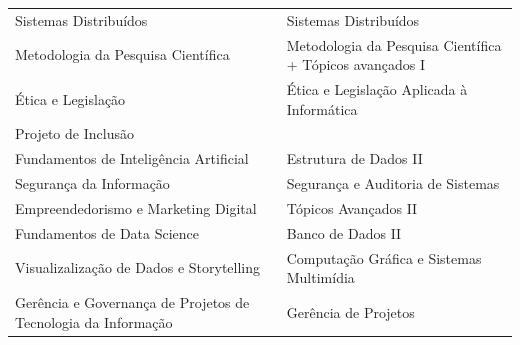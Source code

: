 \documentclass[11pt,fleqn]{book} %
\begin{document}
\begin{table}[]
{\begin{tabular}{@{}l|l@{}}
			Sistemas Distribuídos                                         & Sistemas Distribuídos                                                     \\
			Metodologia da Pesquisa Científica                            & Metodologia da Pesquisa Científica + Tópicos avançados I                  \\
			Ética e Legislação                                            & Ética e Legislação Aplicada à Informática                                 \\
			Projeto de Inclusão                                           &                                                                           \\
			Fundamentos de Inteligência Artificial                        & Estrutura de Dados II                                                     \\
			Segurança da Informação                                       & Segurança e Auditoria de Sistemas                                         \\
			Empreendedorismo e Marketing Digital                          & Tópicos Avançados II                                                      \\
			Fundamentos de Data Science                                   & Banco de Dados II                                                         \\
			Visualizalização de Dados e Storytelling                      & Computação Gráfica e Sistemas Multimídia                                  \\
			Gerência e Governança de Projetos de Tecnologia da Informação & Gerência de Projetos                                                      \\ \bottomrule
		\end{tabular}%
	}
\end{table}
\end{document}
